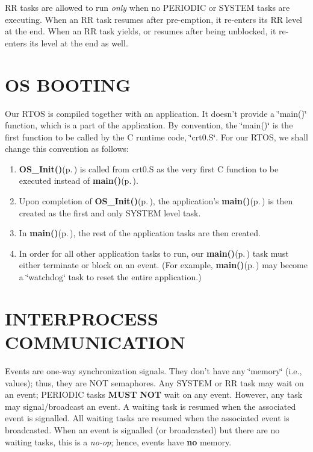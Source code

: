 RR tasks are allowed to run {\em only\/} when no PERIODIC or SYSTEM tasks are executing. When an RR task resumes after pre-emption, it re-enters its RR level at the end. When an RR task yields, or resumes after being unblocked, it re-enters its level at the end as well.\section{OS BOOTING}\label{index_boot}
Our RTOS is compiled together with an application. It doesn't provide a \char`\"{}main()\char`\"{} function, which is a part of the application. By convention, the \char`\"{}main()\char`\"{} is the first function to be called by the C runtime code, \char`\"{}crt0.S\char`\"{}. For our RTOS, we shall change this convention as follows:\begin{enumerate}
\item {\bf OS\_\-Init()}{\rm (p.\,\pageref{os_8c_280149a9407c6504ce0af541351561db})} is called from crt0.S as the very first C function to be executed instead of {\bf main()}{\rm (p.\,\pageref{_assignment2_8c_840291bc02cba5474a4cb46a9b9566fe})}.\item Upon completion of {\bf OS\_\-Init()}{\rm (p.\,\pageref{os_8c_280149a9407c6504ce0af541351561db})}, the application's {\bf main()}{\rm (p.\,\pageref{_assignment2_8c_840291bc02cba5474a4cb46a9b9566fe})} is then created as the first and only SYSTEM level task.\item In {\bf main()}{\rm (p.\,\pageref{_assignment2_8c_840291bc02cba5474a4cb46a9b9566fe})}, the rest of the application tasks are then created.\item In order for all other application tasks to run, our {\bf main()}{\rm (p.\,\pageref{_assignment2_8c_840291bc02cba5474a4cb46a9b9566fe})} task must either terminate or block on an event. (For example, {\bf main()}{\rm (p.\,\pageref{_assignment2_8c_840291bc02cba5474a4cb46a9b9566fe})} may become a \char`\"{}watchdog\char`\"{} task to reset the entire application.)\end{enumerate}
\section{INTERPROCESS COMMUNICATION}\label{index_ipc}
Events are one-way synchronization signals. They don't have any \char`\"{}memory\char`\"{} (i.e., values); thus, they are NOT semaphores. Any SYSTEM or RR task may wait on an event; PERIODIC tasks {\bf MUST} {\bf NOT} wait on any event. However, any task may signal/broadcast an event. A waiting task is resumed when the associated event is signalled. All waiting tasks are resumed when the associated event is broadcasted. When an event is signalled (or broadcasted) but there are no waiting tasks, this is a {\em no-op\/}; hence, events have {\bf no} memory. 